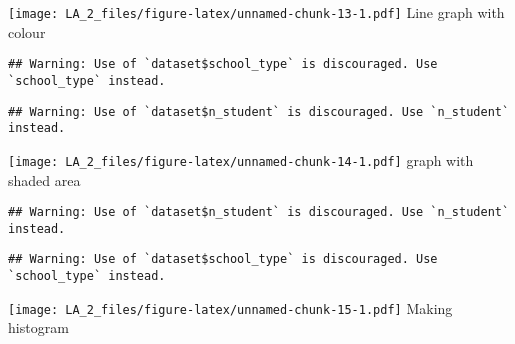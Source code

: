 \documentclass[
]{article}
\newenvironment{Shaded}{\begin{snugshade}}{\end{snugshade}}
\newcommand{\AttributeTok}[1]{\textcolor[rgb]{0.77,0.63,0.00}{#1}}
\newcommand{\DecValTok}[1]{\textcolor[rgb]{0.00,0.00,0.81}{#1}}
\newcommand{\FunctionTok}[1]{\textcolor[rgb]{0.00,0.00,0.00}{#1}}
\newcommand{\NormalTok}[1]{#1}
\newcommand{\SpecialCharTok}[1]{\textcolor[rgb]{0.00,0.00,0.00}{#1}}
\newcommand{\StringTok}[1]{\textcolor[rgb]{0.31,0.60,0.02}{#1}}
\begin{document}
\texttt{[image: LA\_2\_files/figure-latex/unnamed-chunk-13-1.pdf]} Line
graph with colour

\begin{Shaded}
\end{Shaded}

\begin{verbatim}
## Warning: Use of `dataset$school_type` is discouraged. Use `school_type` instead.
\end{verbatim}

\begin{verbatim}
## Warning: Use of `dataset$n_student` is discouraged. Use `n_student` instead.
\end{verbatim}

\texttt{[image: LA\_2\_files/figure-latex/unnamed-chunk-14-1.pdf]} graph
with shaded area

\begin{Shaded}
\end{Shaded}

\begin{verbatim}
## Warning: Use of `dataset$n_student` is discouraged. Use `n_student` instead.
\end{verbatim}

\begin{verbatim}
## Warning: Use of `dataset$school_type` is discouraged. Use `school_type` instead.
\end{verbatim}

\texttt{[image: LA\_2\_files/figure-latex/unnamed-chunk-15-1.pdf]} Making
histogram
\end{document}
